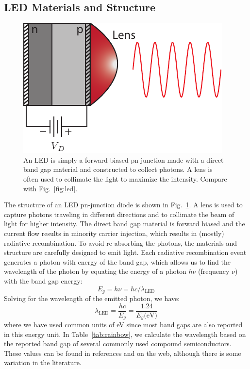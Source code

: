 \subsection{LED Materials and Structure}
\begin{figure}[tb]
\centering
\includegraphics[width=.35\columnwidth]{led_struct}
\caption{An LED is simply a forward biased pn junction made with a direct band gap material and constructed to collect photons.  A lens is often used to collimate the light to maximize the intensity.  Compare with Fig.~\ref{fig:led}.}
\label{fig:led_struct}
\end{figure}
The structure of an LED pn-junction diode is shown in Fig.~\ref{fig:led_struct}.  A lens is used to capture photons traveling in different directions and to collimate the beam of light for higher intensity.    The direct band gap material is forward biased and the current flow results in minority carrier injection, which results in (mostly) radiative recombination.  To avoid re-absorbing the photons, the materials and structure are carefully designed to emit light. 
Each radiative recombination event generates a photon with energy of the band gap, which allows us to find the wavelength of the photon by equating the energy of a photon $h \nu$ (frequency $\nu$) with the band gap energy:
    \begin{equation} 
        E_g = h \nu = h c / \lambda_{\text{LED}} 
    \end{equation}
Solving for the wavelength of the emitted photon, we have:
    \begin{equation} 
        \lambda_{\text{LED}} = \frac{hc}{E_g} = \frac{1.24}{E_g \text{(eV)}}
    \end{equation}
where we have used common units of eV since most band gaps are also reported in this energy unit.  In Table~\ref{tab:rainbow}, we calculate the wavelength based on the reported band gap of several commonly used compound semiconductors.  These values can be found in references and on the web, although there is some variation in the literature.
